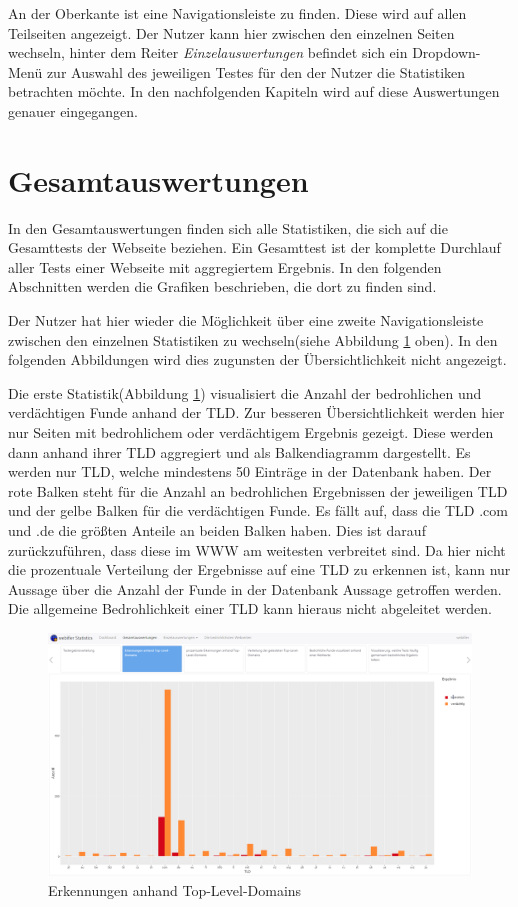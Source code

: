 An der Oberkante ist eine Navigationsleiste zu finden. Diese wird auf allen Teilseiten angezeigt. Der Nutzer kann hier zwischen den einzelnen Seiten wechseln, hinter dem Reiter \textit{Einzelauswertungen} befindet sich ein Dropdown-Menü zur Auswahl des jeweiligen Testes für den der Nutzer die Statistiken betrachten möchte. In den nachfolgenden Kapiteln wird auf diese Auswertungen genauer eingegangen.

\section{Gesamtauswertungen}
In den Gesamtauswertungen finden sich alle Statistiken, die sich auf die Gesamttests der Webseite beziehen. Ein Gesamttest ist der komplette Durchlauf aller Tests einer Webseite mit aggregiertem Ergebnis. In den folgenden Abschnitten werden die Grafiken beschrieben, die dort zu finden sind.

Der Nutzer hat hier wieder die Möglichkeit über eine zweite Navigationsleiste zwischen den einzelnen Statistiken zu wechseln(siehe Abbildung \ref{fig:tlderkennungen} oben). In den folgenden Abbildungen wird dies zugunsten der Übersichtlichkeit nicht angezeigt.

Die erste Statistik(Abbildung \ref{fig:tlderkennungen}) visualisiert die Anzahl der bedrohlichen und verdächtigen Funde anhand der \ac{TLD}. Zur besseren Übersichtlichkeit werden hier nur Seiten mit bedrohlichem oder verdächtigem Ergebnis gezeigt. Diese werden dann anhand ihrer \ac{TLD} aggregiert und als Balkendiagramm dargestellt. Es werden nur \ac{TLD}, welche mindestens 50 Einträge in der Datenbank haben. Der rote Balken steht für die Anzahl an bedrohlichen Ergebnissen der jeweiligen \ac{TLD} und der gelbe Balken für die verdächtigen Funde. Es fällt auf, dass die \ac{TLD} .com und .de die größten Anteile an beiden Balken haben. Dies ist darauf zurückzuführen, dass diese im \ac{WWW} am weitesten verbreitet sind. Da hier nicht die prozentuale Verteilung der Ergebnisse auf eine \ac{TLD} zu erkennen ist, kann nur Aussage über die Anzahl der Funde in der Datenbank Aussage getroffen werden. Die allgemeine Bedrohlichkeit einer \ac{TLD} kann hieraus nicht abgeleitet werden.
\begin{figure}[H]
  \centering
  \includegraphics[width=15cm]{images/stats/tlderkennungen}
  \caption{Erkennungen anhand Top-Level-Domains}
  \label{fig:tlderkennungen}
\end{figure}

